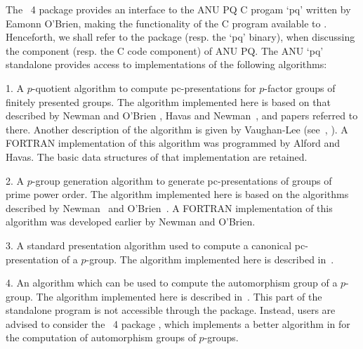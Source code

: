 

The {\GAP}~4 package {\ANUPQ} provides an  interface  to  the  ANU  PQ  C
progam `pq' written by Eamonn O'Brien, making the functionality of the  C
program available to {\GAP}. Henceforth, we shall refer to  the  {\ANUPQ}
package (resp. the `pq' binary), when  discussing  the  {\GAP}  component
(resp. the C code component) of ANU PQ. The ANU `pq' standalone  provides
access to implementations of the following algorithms:

\beginlist

\item{1.}
A $p$-quotient  algorithm  to  compute  pc-presentations  for  $p$-factor
groups of finitely presented groups. The algorithm  implemented  here  is
based on that described by Newman  and  O'Brien  \cite{NO96},  Havas  and
Newman~\cite{HN80}, and papers referred to there. Another description  of
the algorithm is given by Vaughan-Lee (see~\cite{Vau90a}, \cite{Vau90b}).
A FORTRAN implementation of this algorithm was programmed by  Alford  and
Havas. The basic data structures of that implementation are retained.

\item{2.} 
A $p$-group generation algorithm to generate pc-presentations  of  groups
of prime power order. The algorithm implemented  here  is  based  on  the
algorithms described by Newman~\cite{New77} and  O'Brien~\cite{OBr90}.  A
FORTRAN implementation of this algorithm was developed earlier by  Newman
and O'Brien.

\item{3.}
A  standard  presentation  algorithm  used   to   compute   a   canonical
pc-presentation  of  a  $p$-group.  The  algorithm  implemented  here  is
described in~\cite{OBr94}.

\item{4.} 
An algorithm which can be used to compute the  automorphism  group  of  a
$p$-group. The algorithm implemented here is  described  in~\cite{OBr94}.
This part of  the  standalone  program  is  not  accessible  through  the
{\ANUPQ} package. Instead, users are advised  to  consider  the  {\GAP}~4
package {\AutPGrp}, which implements a better algorithm in {\GAP} for the
computation of automorphism groups of $p$-groups.

